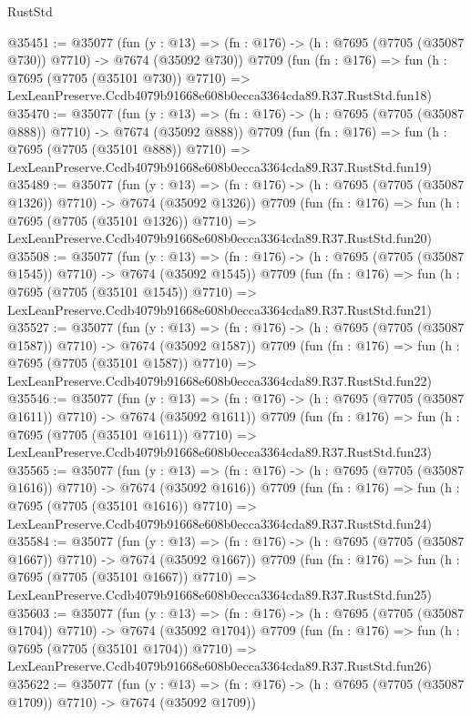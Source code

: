 \begin{lexlean}{RustStd}
\begin{coremodule}
@35451 := @35077
    (fun (y : @13) => (fn : @176) -> (h : @7695 (@7705 (@35087 @730)) @7710) -> @7674 (@35092 @730))
    @7709
    (fun (fn : @176) =>
    fun (h : @7695 (@7705 (@35101 @730)) @7710) =>
    LexLeanPreserve.Ccdb4079b91668e608b0ecca3364cda89.R37.RustStd.fun18)
@35470 := @35077
    (fun (y : @13) => (fn : @176) -> (h : @7695 (@7705 (@35087 @888)) @7710) -> @7674 (@35092 @888))
    @7709
    (fun (fn : @176) =>
    fun (h : @7695 (@7705 (@35101 @888)) @7710) =>
    LexLeanPreserve.Ccdb4079b91668e608b0ecca3364cda89.R37.RustStd.fun19)
@35489 := @35077
    (fun (y : @13) =>
    (fn : @176) -> (h : @7695 (@7705 (@35087 @1326)) @7710) -> @7674 (@35092 @1326))
    @7709
    (fun (fn : @176) =>
    fun (h : @7695 (@7705 (@35101 @1326)) @7710) =>
    LexLeanPreserve.Ccdb4079b91668e608b0ecca3364cda89.R37.RustStd.fun20)
@35508 := @35077
    (fun (y : @13) =>
    (fn : @176) -> (h : @7695 (@7705 (@35087 @1545)) @7710) -> @7674 (@35092 @1545))
    @7709
    (fun (fn : @176) =>
    fun (h : @7695 (@7705 (@35101 @1545)) @7710) =>
    LexLeanPreserve.Ccdb4079b91668e608b0ecca3364cda89.R37.RustStd.fun21)
@35527 := @35077
    (fun (y : @13) =>
    (fn : @176) -> (h : @7695 (@7705 (@35087 @1587)) @7710) -> @7674 (@35092 @1587))
    @7709
    (fun (fn : @176) =>
    fun (h : @7695 (@7705 (@35101 @1587)) @7710) =>
    LexLeanPreserve.Ccdb4079b91668e608b0ecca3364cda89.R37.RustStd.fun22)
@35546 := @35077
    (fun (y : @13) =>
    (fn : @176) -> (h : @7695 (@7705 (@35087 @1611)) @7710) -> @7674 (@35092 @1611))
    @7709
    (fun (fn : @176) =>
    fun (h : @7695 (@7705 (@35101 @1611)) @7710) =>
    LexLeanPreserve.Ccdb4079b91668e608b0ecca3364cda89.R37.RustStd.fun23)
@35565 := @35077
    (fun (y : @13) =>
    (fn : @176) -> (h : @7695 (@7705 (@35087 @1616)) @7710) -> @7674 (@35092 @1616))
    @7709
    (fun (fn : @176) =>
    fun (h : @7695 (@7705 (@35101 @1616)) @7710) =>
    LexLeanPreserve.Ccdb4079b91668e608b0ecca3364cda89.R37.RustStd.fun24)
@35584 := @35077
    (fun (y : @13) =>
    (fn : @176) -> (h : @7695 (@7705 (@35087 @1667)) @7710) -> @7674 (@35092 @1667))
    @7709
    (fun (fn : @176) =>
    fun (h : @7695 (@7705 (@35101 @1667)) @7710) =>
    LexLeanPreserve.Ccdb4079b91668e608b0ecca3364cda89.R37.RustStd.fun25)
@35603 := @35077
    (fun (y : @13) =>
    (fn : @176) -> (h : @7695 (@7705 (@35087 @1704)) @7710) -> @7674 (@35092 @1704))
    @7709
    (fun (fn : @176) =>
    fun (h : @7695 (@7705 (@35101 @1704)) @7710) =>
    LexLeanPreserve.Ccdb4079b91668e608b0ecca3364cda89.R37.RustStd.fun26)
@35622 := @35077
    (fun (y : @13) =>
    (fn : @176) -> (h : @7695 (@7705 (@35087 @1709)) @7710) -> @7674 (@35092 @1709))

\end{coremodule}
\end{lexlean}
